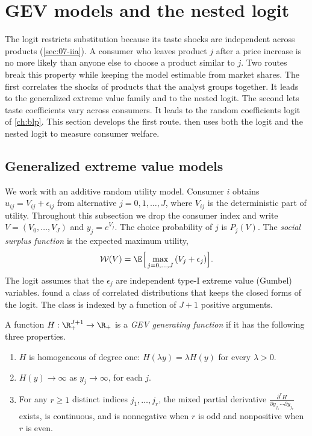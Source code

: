 \section{GEV models and the nested logit}\label{sec:07-nested}

The logit restricts substitution because its taste shocks are independent across products (\cref{sec:07-iia}).
A consumer who leaves product $j$ after a price increase is no more likely than anyone else to choose a
product similar to $j$. Two routes break this property while keeping the model estimable from market shares.
The first correlates the shocks of products that the analyst groups together. It leads to the generalized
extreme value family and to the nested logit. The second lets taste coefficients vary across consumers. It
leads to the random coefficients logit of \cref{ch:blp}. This section develops the first route.
 then uses both the logit and the nested logit to measure consumer welfare.

\subsection{Generalized extreme value models}\label{sec:07-gev}

We work with an additive random utility model. Consumer $i$ obtains $u_{ij} = V_{ij} + \epsilon_{ij}$ from
alternative $j = 0, 1, \dots, J$, where $V_{ij}$ is the deterministic part of utility. Throughout this
subsection we drop the consumer index and write $V = (V_0, \dots, V_J)$ and $y_j = e^{V_j}$. The choice
probability of $j$ is $P_j(V)$. The \emph{social surplus function} is the expected maximum utility,
\begin{equation}\label{eq:07-surplus}
\mathcal{W}(V) = \E\Big[\max_{j = 0, \dots, J}\,(V_j + \epsilon_j)\Big].
\end{equation}
The logit assumes that the $\epsilon_j$ are independent type-I extreme value (Gumbel) variables.
\citet{McFadden1978} found a class of correlated distributions that keeps the closed forms of the logit. The class
is indexed by a function of $J + 1$ positive arguments.

\begin{definition}\label{def:07-gev}
A function $H : \R^{J+1}_+ \to \R_+$ is a \emph{GEV generating function} if it has the following three
properties.
\begin{enumerate}[label=(G\arabic*)]
  \item $H$ is homogeneous of degree one: $H(\lambda y) = \lambda H(y)$ for every $\lambda > 0$.
  \item $H(y) \to \infty$ as $y_j \to \infty$, for each $j$.
  \item For any $r \ge 1$ distinct indices $j_1, \dots, j_r$, the mixed partial derivative
  $\frac{\partial^r H}{\partial y_{j_1}\cdots\partial y_{j_r}}$ exists, is continuous, and is nonnegative when
  $r$ is odd and nonpositive when $r$ is even.
\end{enumerate}
\end{definition}

